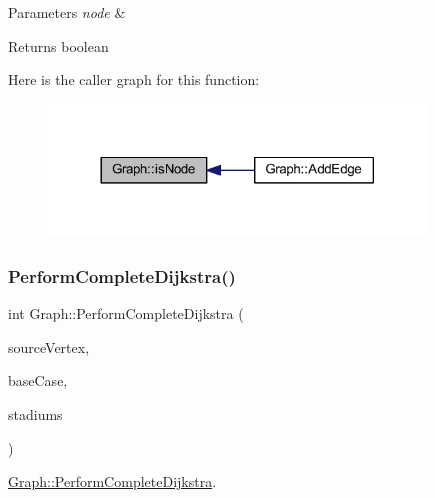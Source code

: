 \begin{DoxyParams}{Parameters}
{\em node} & \\
\hline
\end{DoxyParams}
\begin{DoxyReturn}{Returns}
boolean 
\end{DoxyReturn}
Here is the caller graph for this function\+:
\nopagebreak
\begin{figure}[H]
\begin{center}
\leavevmode
\includegraphics[width=284pt]{class_graph_a981460a9962c0cccada8459347a5fd5d_icgraph}
\end{center}
\end{figure}
\mbox{\label{class_graph_a3bb92a2d9cba33ba8e960eccb9c34f78}} 
\subsubsection{\texorpdfstring{Perform\+Complete\+Dijkstra()}{PerformCompleteDijkstra()}}
{\footnotesize\ttfamily int Graph\+::\+Perform\+Complete\+Dijkstra (\begin{DoxyParamCaption}\item[{int}]{source\+Vertex,  }\item[{int}]{base\+Case,  }\item[{Q\+Vector$<$ Q\+String $>$ \&}]{stadiums }\end{DoxyParamCaption})}



\mbox{\hyperlink{class_graph_a3bb92a2d9cba33ba8e960eccb9c34f78}{Graph\+::\+Perform\+Complete\+Dijkstra}}. 


